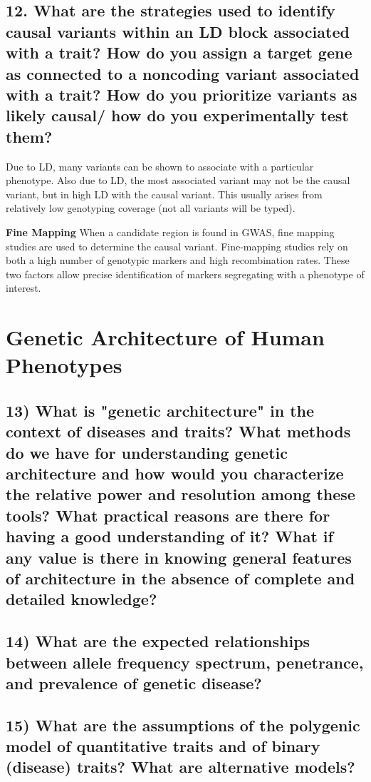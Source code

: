 \documentclass{tufte-handout}
\theoremstyle{noparens}
\begin{document}
\newpage
\subsection{12. What are the strategies used to identify causal variants within an LD block associated with a trait? How do you assign a target gene as connected to a noncoding variant associated with a trait? How do you prioritize variants as likely causal/ how do you experimentally test them?}

Due to LD, many variants can be shown to associate with a particular phenotype. Also due to LD, the most associated variant may not be the causal variant, but in high LD with the causal variant. This usually arises from relatively low genotyping coverage (not all variants will be typed).

\noindent
\textbf{Fine Mapping}
When a candidate region is found in GWAS, fine mapping studies are used to determine the causal variant. Fine-mapping studies rely on both a high number of genotypic markers and high recombination rates. These two factors allow precise identification of markers segregating with a phenotype of interest.

\newpage
\section{Genetic Architecture of Human Phenotypes}\label{sec:genarch}
\subsection{13) What is "genetic architecture" in the context of diseases and traits? What methods do we have for understanding genetic architecture and how would you characterize the relative power and resolution among these tools? What practical reasons are there for having a good understanding of it? What if any value is there in knowing general features of architecture in the absence of complete and detailed knowledge?}

\subsection{14) What are the expected relationships between allele frequency spectrum, penetrance, and prevalence of genetic disease?}

\newpage
\subsection{15) What are the assumptions of the polygenic model of quantitative traits and of binary (disease) traits? What are alternative models?}
\end{document}
